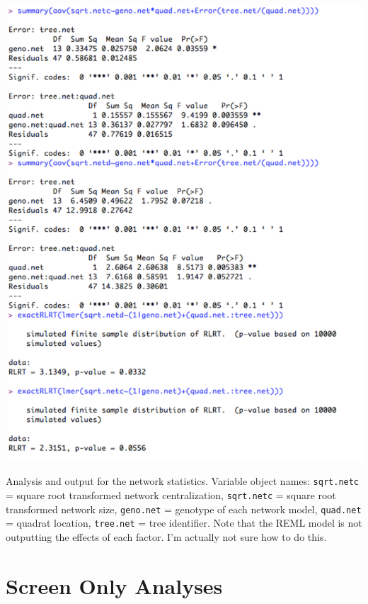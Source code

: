\documentclass[11pt]{article}
\begin{document}
\begin{table}[h]
\includegraphics[scale=1]{Routput}
\caption{Analysis and output for the network statistics. Variable object names: \texttt{sqrt.netc} = square root transformed network centralization, \texttt{sqrt.netc} = square root transformed network size, \texttt{geno.net} = genotype of each network model, \texttt{quad.net} = quadrat location, \texttt{tree.net} = tree identifier. Note that the REML model is not outputting the effects of each factor. I'm actually not sure how to do this.}
\end{table}

\newpage
\section*{Screen Only Analyses}
\end{document}
